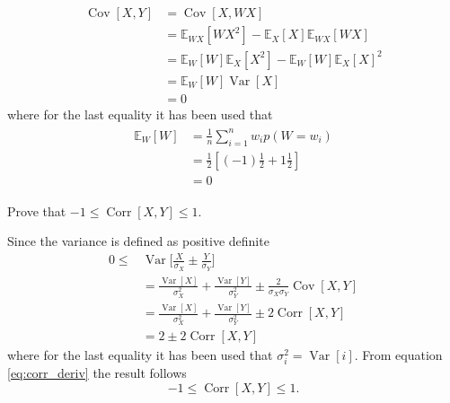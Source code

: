 \begin{example}
\begin{enumerate}
		\begin{equation}
			\begin{split}
				\operatorname{Cov}[X,Y] &= \operatorname{Cov}[X,WX] \\
				&= \mathbb{E}_{WX}[WX^2]-\mathbb{E}_X[X]\mathbb{E}_{WX}[WX]\\
				&= \mathbb{E}_W[W]\mathbb{E}_X[X^2]-\mathbb{E}_W[W]\mathbb{E}_X[X]^2\\
				&= \mathbb{E}_W[W]\operatorname{Var}[X]\\
				& = 0
			\end{split}
		\end{equation}
		where for the last equality it has been used that
		\begin{equation}
			\begin{split}
				\begin{split}
					\mathbb{E}_W[W]&= \frac{1}{n}\sum_{i=1}^nw_ip(W = w_i)\\
					&= \frac{1}{2}[(-1)\frac{1}{2}+1\frac{1}{2}]\\
					&= 0
				\end{split}
			\end{split}
		\end{equation}
		
	\end{enumerate}
	
\end{example}

\newpage
\begin{example}
	Prove that $-1\leq \operatorname{Corr}[X,Y]\leq 1$.\newline
	
	Since the variance is defined as positive definite
	\begin{equation}
		\label{eq:corr_deriv}
		\begin{split}
			0\leq& \operatorname{Var}\bigg[\frac{X}{\sigma_X}\pm\frac{Y}{\sigma_Y}\bigg]\\
			& = \frac{\operatorname{Var}[X]}{\sigma_X^2}+\frac{\operatorname{Var}[Y]}{\sigma_Y^2}\pm \frac{2}{\sigma_X\sigma_Y}\operatorname{Cov}[X,Y]\\
			& = \frac{\operatorname{Var}[X]}{\sigma_X^2}+\frac{\operatorname{Var}[Y]}{\sigma_Y^2}\pm 2\operatorname{Corr}[X,Y]\\
			& = 2\pm 2\operatorname{Corr}[X,Y]
		\end{split}
	\end{equation}
	where for the last equality it has been used that $\sigma_i^2=\operatorname{Var}[i]$. From equation \eqref{eq:corr_deriv} the result follows
	\begin{equation}
		-1\leq \operatorname{Corr}[X,Y]\leq 1.
	\end{equation}	
\end{example}

